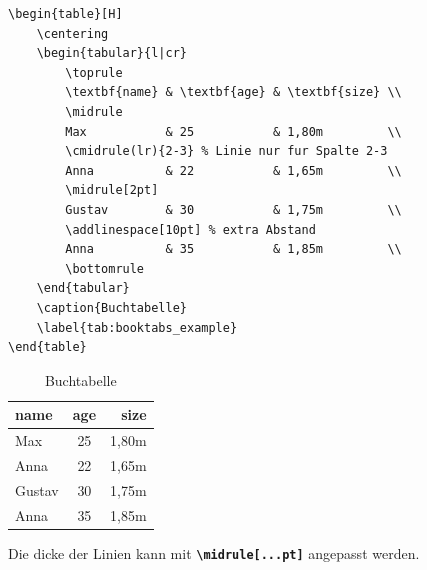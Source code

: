 \begin{minipage}{0.70\textwidth}
    \begin{lstlisting}[language={[LaTeX]TeX}, basicstyle=\small\ttfamily]
\begin{table}[H]
    \centering
    \begin{tabular}{l|cr}
        \toprule
        \textbf{name} & \textbf{age} & \textbf{size} \\
        \midrule
        Max           & 25           & 1,80m         \\
        \cmidrule(lr){2-3} % Linie nur fur Spalte 2-3
        Anna          & 22           & 1,65m         \\
        \midrule[2pt]
        Gustav        & 30           & 1,75m         \\
        \addlinespace[10pt] % extra Abstand 
        Anna          & 35           & 1,85m         \\
        \bottomrule
    \end{tabular}
    \caption{Buchtabelle}
    \label{tab:booktabs_example}
\end{table}
    \end{lstlisting}
\end{minipage}
\hfill
\begin{minipage}{0.3\textwidth}
    \begin{table}[H]
        \centering
        \begin{tabular}{l|cr}
            \toprule
            \textbf{name} & \textbf{age} & \textbf{size} \\
            \midrule
            Max           & 25           & 1,80m         \\
            \cmidrule(lr){2-3}  %
            Anna          & 22           & 1,65m         \\
            \midrule[2pt]
            Gustav        & 30           & 1,75m         \\
            \addlinespace[10pt] %
            Anna          & 35           & 1,85m         \\
            \bottomrule
        \end{tabular}
        \caption{Buchtabelle}
        \label{tab:booktabs_example}
    \end{table}
\end{minipage}

Die dicke der Linien kann mit \textbf{\texttt{\textbackslash midrule[...pt]}} angepasst werden.

